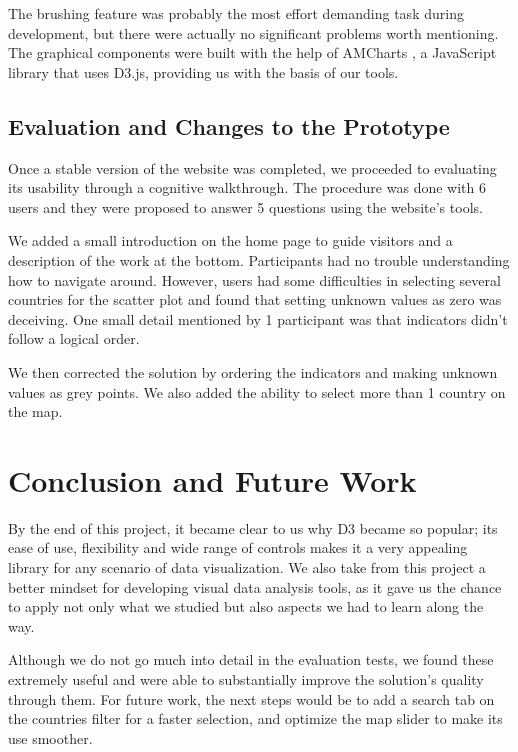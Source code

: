 \documentclass[conference]{IEEEtran}
\begin{document}
The brushing feature was probably the most effort demanding task during development,
but there were actually no significant problems worth mentioning.
The graphical components were built with the help of AMCharts \cite{amcharts}, a
JavaScript library that uses D3.js, providing us with the basis of our tools.

\subsection{Evaluation and Changes to the Prototype}

Once a stable version of the website was completed, we proceeded to evaluating 
its usability through a cognitive walkthrough.
The procedure was done with 6 users and they were proposed to answer 5 questions 
using the website's tools.

We added a small introduction on the home page to guide visitors and a 
description of the work at the bottom.
Participants had no trouble understanding how to navigate around.
However, users had some difficulties in selecting several countries for the 
scatter plot and found that setting unknown values as zero was deceiving.
One small detail mentioned by 1 participant was that indicators didn't follow 
a logical order.

We then corrected the solution by ordering the indicators and making unknown 
values as grey points.
We also added the ability to select more than 1 country on the map.

\section{Conclusion and Future Work}

By the end of this project, it became clear to us why D3 became so popular; 
its ease of use, flexibility and wide range of controls makes it a very appealing 
library for any scenario of data visualization.
We also take from this project a better mindset for developing visual data 
analysis tools, as it gave us the chance to apply not only what we studied but 
also aspects we had to learn along the way.

Although we do not go much into detail in the evaluation tests, we found these
extremely useful and were able to substantially improve the solution's quality
through them.
For future work, the next steps would be to add a search tab on the countries 
filter for a faster selection, and optimize the map slider to make its use 
smoother.
\end{document}
